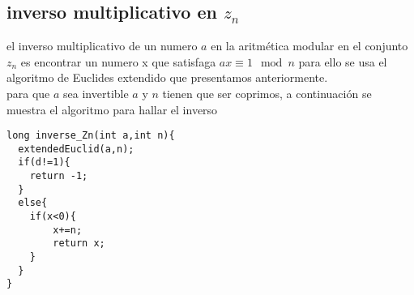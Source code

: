 \subsection{inverso multiplicativo en $z_{n}$}
el inverso multiplicativo de un numero $a$ en la aritmética modular en el conjunto $z_{n}$ es encontrar un numero
x que satisfaga $ax \equiv 1 \mod{n}$ para ello se usa el algoritmo de Euclides extendido que presentamos anteriormente.\\
para que $a$ sea invertible $a$ y $n$ tienen que ser coprimos, a continuación se muestra el algoritmo para hallar el inverso
\begin{lstlisting}[style=C]
long inverse_Zn(int a,int n){
  extendedEuclid(a,n);
  if(d!=1){
  	return -1;
  }
  else{
  	if(x<0){
  		x+=n;
   		return x;
  	}
  }
}
\end{lstlisting}
